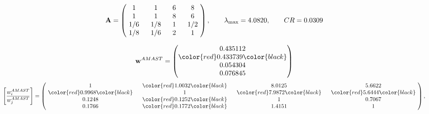 \begin{example}
\begin{equation*}
\mathbf{A} =
\begin{pmatrix}
$\,\,$ 1 $\,\,$ & $\,\,$1$\,\,$ & $\,\,$6$\,\,$ & $\,\,$8 $\,\,$ \\
$\,\,$ 1 $\,\,$ & $\,\,$ 1 $\,\,$ & $\,\,$8$\,\,$ & $\,\,$6 $\,\,$ \\
$\,\,$ 1/6$\,\,$ & $\,\,$ 1/8$\,\,$ & $\,\,$ 1 $\,\,$ & $\,\,$ 1/2 $\,\,$ \\
$\,\,$ 1/8$\,\,$ & $\,\,$ 1/6$\,\,$ & $\,\,$2$\,\,$ & $\,\,$ 1  $\,\,$ \\
\end{pmatrix},
\qquad
\lambda_{\max} =
4.0820,
\qquad
CR = 0.0309
\end{equation*}

\begin{equation*}
\mathbf{w}^{AMAST} =
\begin{pmatrix}
0.435112\\
\color{red} 0.433739\color{black} \\
0.054304\\
0.076845
\end{pmatrix}\end{equation*}
\begin{equation*}
\left[ \frac{{w}^{AMAST}_i}{{w}^{AMAST}_j} \right] =
\begin{pmatrix}
$\,\,$ 1 $\,\,$ & $\,\,$\color{red} 1.0032\color{black} $\,\,$ & $\,\,$8.0125$\,\,$ & $\,\,$5.6622$\,\,$ \\
$\,\,$\color{red} 0.9968\color{black} $\,\,$ & $\,\,$ 1 $\,\,$ & $\,\,$\color{red} 7.9872\color{black} $\,\,$ & $\,\,$\color{red} 5.6444\color{black}   $\,\,$ \\
$\,\,$0.1248$\,\,$ & $\,\,$\color{red} 0.1252\color{black} $\,\,$ & $\,\,$ 1 $\,\,$ & $\,\,$0.7067 $\,\,$ \\
$\,\,$0.1766$\,\,$ & $\,\,$\color{red} 0.1772\color{black} $\,\,$ & $\,\,$1.4151$\,\,$ & $\,\,$ 1  $\,\,$ \\
\end{pmatrix},
\end{equation*}


\end{example}
